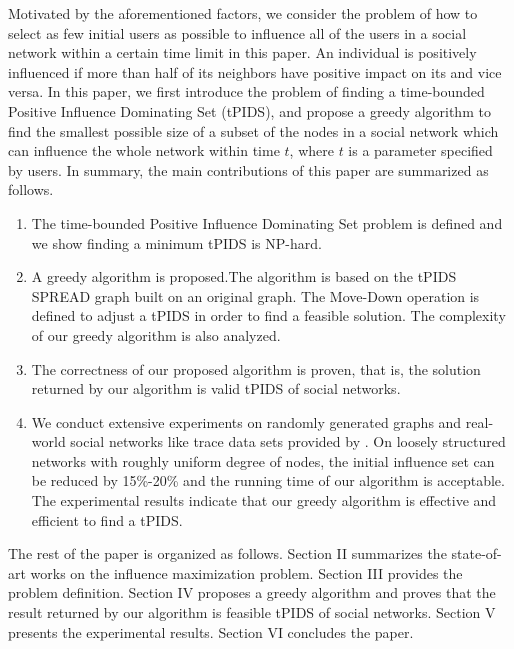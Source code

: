 Motivated by the aforementioned factors, we consider the problem of how to select as few initial users as possible to influence all of the users
in a social network within a certain time limit in this paper.
An individual is positively influenced if more than half of its neighbors have positive impact on its and vice versa.
In this paper, we first introduce the problem of finding a time-bounded Positive Influence Dominating Set (tPIDS), and propose a greedy algorithm to find the smallest possible size of a subset of the nodes in a social network which can
influence the whole network within time $t$, where $t$ is a parameter specified by users.
In summary, the main contributions of this paper are summarized as follows.
\begin{enumerate}
	 \item The time-bounded Positive Influence Dominating Set problem is defined and we show finding a minimum tPIDS is NP-hard.
	 \item A greedy algorithm is proposed.The algorithm is based on the tPIDS SPREAD graph built on an original graph.
	 The Move-Down operation is defined to adjust a tPIDS in order to find a feasible solution.
	 The complexity of our greedy algorithm is also analyzed.
	 \item The correctness of our proposed algorithm is proven, that is, the solution returned by our algorithm is valid tPIDS of social networks.
	 \item We conduct extensive experiments on randomly generated graphs and real-world social networks like trace data sets provided by \cite{sju}. On loosely structured networks with roughly uniform degree of nodes, the initial influence set can be reduced by 15\%-20\% and the running time of our algorithm is acceptable. The experimental results indicate that our greedy algorithm is effective and efficient to find a tPIDS. \\
\end{enumerate}

The rest of the paper is organized as follows.
Section II summarizes the state-of-art works on the influence maximization problem.
Section III provides the problem definition.
Section IV proposes a greedy algorithm and proves that the result returned by our algorithm is feasible tPIDS of social networks.
Section V presents the experimental results.
Section VI concludes the paper.
